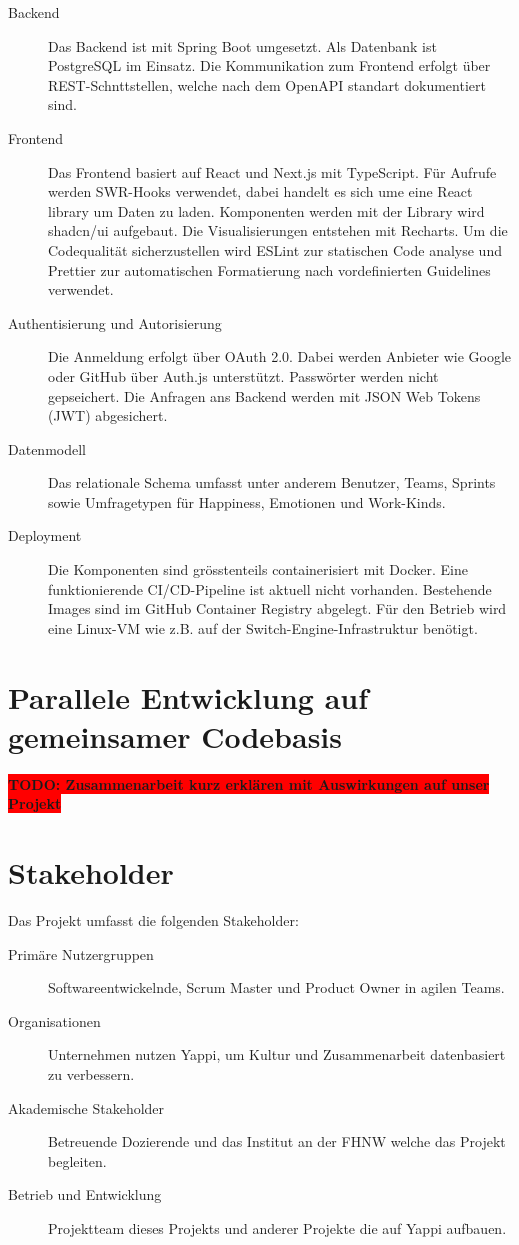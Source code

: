 \documentclass[12pt,a4paper]{report}
\newcommand{\todo}[1]{\colorbox{red}{\textbf{TODO: #1}}\\}
\begin{document}
\begin{description}
  \item[Backend] Das Backend ist mit Spring Boot umgesetzt. Als Datenbank ist PostgreSQL im Einsatz. Die Kommunikation zum Frontend
    erfolgt über REST-Schnttstellen, welche nach dem OpenAPI standart dokumentiert sind.
  \item[Frontend] Das Frontend basiert auf React und Next.js mit TypeScript. Für Aufrufe werden SWR-Hooks verwendet, dabei handelt
    es sich ume eine React library um Daten zu laden. Komponenten werden mit der Library wird shadcn/ui aufgebaut. Die 
    Visualisierungen entstehen mit Recharts. Um die Codequalität sicherzustellen wird ESLint zur statischen Code analyse und 
    Prettier zur automatischen Formatierung nach vordefinierten Guidelines verwendet.
  \item[Authentisierung und Autorisierung] Die Anmeldung erfolgt über OAuth 2.0. Dabei werden Anbieter wie Google oder GitHub 
    über Auth.js unterstützt. Passwörter werden nicht gepseichert. Die Anfragen ans Backend werden mit JSON Web Tokens (JWT) 
    abgesichert.
  \item[Datenmodell] Das relationale Schema umfasst unter anderem Benutzer, Teams, Sprints sowie Umfragetypen für Happiness,
    Emotionen und Work-Kinds.
  \item[Deployment] Die Komponenten sind grösstenteils containerisiert mit Docker. Eine funktionierende CI/CD-Pipeline ist aktuell
    nicht vorhanden. Bestehende Images sind im GitHub Container Registry abgelegt. Für den Betrieb wird eine Linux-VM wie z.B. auf
    der Switch-Engine-Infrastruktur benötigt.
\end{description}
\section{Parallele Entwicklung auf gemeinsamer Codebasis}

\todo{Zusammenarbeit kurz erklären mit Auswirkungen auf unser Projekt}

\section{Stakeholder}

Das Projekt umfasst die folgenden Stakeholder:

\begin{description}
  \item[Primäre Nutzergruppen] Softwareentwickelnde, Scrum Master und Product Owner in agilen Teams. 
  \item[Organisationen] Unternehmen nutzen Yappi, um Kultur und Zusammenarbeit datenbasiert zu verbessern.
  \item[Akademische Stakeholder] Betreuende Dozierende und das Institut an der FHNW welche das Projekt begleiten.
  \item[Betrieb und Entwicklung] Projektteam dieses Projekts und anderer Projekte die auf Yappi aufbauen.
\end{description}
\end{document}
